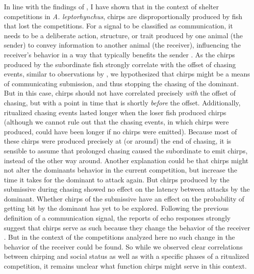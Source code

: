 In line with the findings of
\textcite{hupeElectrocommunicationSpeciesWeakly2012,
henningerStatisticsNaturalCommunication2018}, I have shown that in the context
of shelter competitions in \textit{A. leptorhynchus}, chirps are
disproportionally produced by fish that lost the competitions. For a signal to
be classified as communication, it needs to be a deliberate action, structure,
or trait produced by one animal (the sender) to convey information to another
animal (the receiver), influencing the receiver's behavior in a way that
typically benefits the sender
\parencite{bradburyPrinciplesAnimalCommunication2011, bergstromEvolution2016,
alcockAnimalBehavior2019}. As the chirps produced by the subordinate fish
strongly correlate with the offset of chasing events, similar to observations
by \textcite{henningerStatisticsNaturalCommunication2018}, we hypothesized that
chirps might be a means of communicating submission, and thus stopping the
chasing of the dominant. But in this case, chirps should not have correlated
precisely \emph{with} the offset of chasing, but with a point in time that is
shortly \emph{before} the offset. Additionally, ritualized chasing events
lasted longer when the loser fish produced chirps (although we cannot rule out
that the chasing events, in which chirps were produced, could have been longer
if no chirps were emitted). Because most of these chirps were produced
precisely at (or around) the end of chasing, it is sensible to assume that
prolonged chasing caused the subordinate to emit chirps, instead of the other
way around. Another explanation could be that chirps might not alter the
dominants behavior in the current competition, but increase the time it takes
for the dominant to attack again. But chirps produced by the submissive during
chasing showed no effect on the latency between attacks by the dominant.
Whether chirps of the submissive have an effect on the probability of getting
bit by the dominant has yet to be explored. Following the previous definition
of a communication signal, the reports of echo responses strongly suggest that
chirps serve as such because they change the behavior of the receiver
\parencite{henningerStatisticsNaturalCommunication2018,
hupeEffectDifferenceFrequency2008, gamasalgadoEchoResponseChirping2011}. But in
the context of the competitions analyzed here no such change in the behavior
of the receiver could be found. So while we observed clear correlations between
chirping and social status as well as with a specific phases of a ritualized
competition, it remains unclear what function chirps might serve in this
context.

